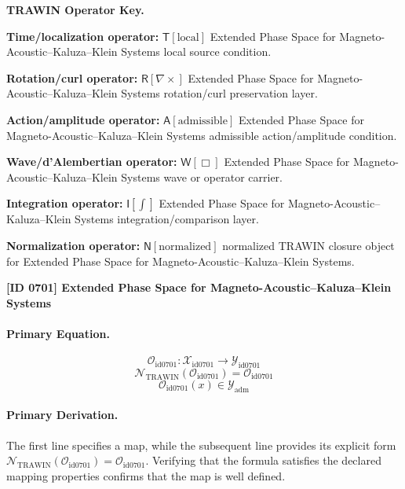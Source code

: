 \par\vspace{0.45\baselineskip}
\noindent\begin{minipage}[t]{\linewidth}
\begingroup
\small
\raggedright
\textbf{TRAWIN Operator Key.}\par
\noindent\textbf{Time/localization operator:} $\mathsf{T}\!\left[\mathrm{local}\right]$ Extended Phase Space for Magneto-Acoustic--Kaluza--Klein Systems local source condition.\par
\noindent\textbf{Rotation/curl operator:} $\mathsf{R}\!\left[\nabla\times\right]$ Extended Phase Space for Magneto-Acoustic--Kaluza--Klein Systems rotation/curl preservation layer.\par
\noindent\textbf{Action/amplitude operator:} $\mathsf{A}\!\left[\mathrm{admissible}\right]$ Extended Phase Space for Magneto-Acoustic--Kaluza--Klein Systems admissible action/amplitude condition.\par
\noindent\textbf{Wave/d'Alembertian operator:} $\mathsf{W}\!\left[\Box\right]$ Extended Phase Space for Magneto-Acoustic--Kaluza--Klein Systems wave or operator carrier.\par
\noindent\textbf{Integration operator:} $\mathsf{I}\!\left[\int\right]$ Extended Phase Space for Magneto-Acoustic--Kaluza--Klein Systems integration/comparison layer.\par
\noindent\textbf{Normalization operator:} $\mathsf{N}\!\left[\mathrm{normalized}\right]$ normalized TRAWIN closure object for Extended Phase Space for Magneto-Acoustic--Kaluza--Klein Systems.\par
\endgroup
\end{minipage}

\clearpage
\noindent\textbf{[ID 0701] Extended Phase Space for Magneto-Acoustic--Kaluza--Klein Systems}\par
\vspace{0.35em}
\paragraph{Primary Equation.}
\[
\mathcal{O}_{\mathrm{id0701}}:\mathcal{X}_{\mathrm{id0701}}\longrightarrow\mathcal{Y}_{\mathrm{id0701}}
\]
\[
\mathcal{N}_{\mathrm{TRAWIN}}(\mathcal{O}_{\mathrm{id0701}})=\mathcal{O}_{\mathrm{id0701}}
\]
\[
\mathcal{O}_{\mathrm{id0701}}(x)\in\mathcal{Y}_{\mathrm{adm}}
\]

\paragraph{Primary Derivation.}
The first line specifies a map, while the subsequent line provides its explicit form \( \mathcal{N}_{\mathrm{TRAWIN}}(\mathcal{O}_{\mathrm{id0701}})=\mathcal{O}_{\mathrm{id0701}} \). Verifying that the formula satisfies the declared mapping properties confirms that the map is well defined.
